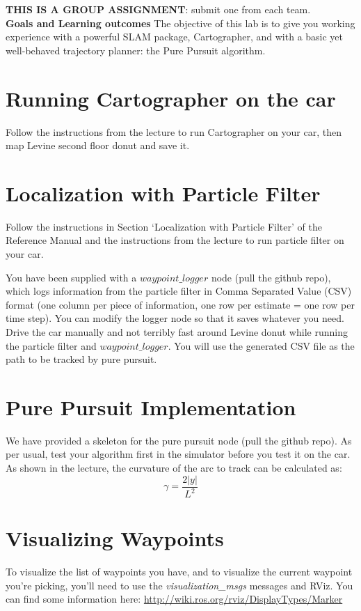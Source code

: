 \documentclass[letta4 paper]{article}
\begin{document}

\textbf{THIS IS A GROUP ASSIGNMENT}: submit one from each team.\\

\noindent \textbf{Goals and Learning outcomes}
The objective of this lab is to give you working experience with a powerful SLAM package, Cartographer, and with a basic yet well-behaved trajectory planner: the Pure Pursuit algorithm.


\section{Running Cartographer on the car}
Follow the instructions from the lecture to run Cartographer on your car, then map Levine second floor donut and save it.


\section{Localization with Particle Filter}
Follow the instructions in Section `Localization with Particle Filter' of the Reference Manual and the instructions from the lecture to run particle filter on your car.


\noindent You have been supplied with a $\textit{waypoint\_logger}$ node (pull the github repo), which logs information from the particle filter in Comma Separated Value (CSV) format (one column per piece of information, one row per estimate = one row per time step). You can modify the logger node so that it saves whatever you need. Drive the car manually and not terribly fast around Levine donut while running the particle filter and $\textit{waypoint\_logger}$. You will use the generated CSV file as the path to be tracked by pure pursuit.


\section{Pure Pursuit Implementation}
We have provided a skeleton for the pure pursuit node (pull the github repo). As per usual, test your algorithm first in the simulator before you test it on the car. As shown in the lecture, the curvature of the arc to track can be calculated as:
\begin{equation}
    \gamma = \frac{2|y|}{L^2}
\end{equation}


\section{Visualizing Waypoints}
To visualize the list of waypoints you have, and to visualize the current waypoint you're picking, you'll need to use the \textit{visualization\_msgs} messages and RViz. You can find some information here: \href{http://wiki.ros.org/rviz/DisplayTypes/Marker}{http://wiki.ros.org/rviz/DisplayTypes/Marker}
\end{document}
